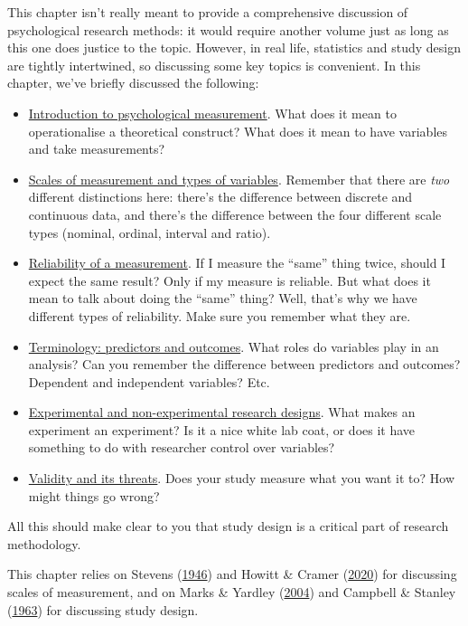 \documentclass[
  11pt,
]{book}
\providecommand{\tightlist}{%
  \setlength{\itemsep}{0pt}\setlength{\parskip}{0pt}}
\theoremstyle{indenteddefinition}
\theoremstyle{indenteddefinition}
\theoremstyle{definition}
\theoremstyle{definition}
\theoremstyle{remark}
\begin{document}
This chapter isn't really meant to provide a comprehensive discussion of psychological research methods: it would require another volume just as long as this one does justice to the topic. However, in real life, statistics and study design are tightly intertwined, so discussing some key topics is convenient. In this chapter, we've briefly discussed the following:

\begin{itemize}
\tightlist
\item
  \protect\hyperlink{measurement}{Introduction to psychological measurement}. What does it mean to operationalise a theoretical construct? What does it mean to have variables and take measurements?
\item
  \protect\hyperlink{scales}{Scales of measurement and types of variables}. Remember that there are \emph{two} different distinctions here: there's the difference between discrete and continuous data, and there's the difference between the four different scale types (nominal, ordinal, interval and ratio).
\item
  \protect\hyperlink{reliability}{Reliability of a measurement}. If I measure the ``same'' thing twice, should I expect the same result? Only if my measure is reliable. But what does it mean to talk about doing the ``same'' thing? Well, that's why we have different types of reliability. Make sure you remember what they are.
\item
  \protect\hyperlink{ivdv}{Terminology: predictors and outcomes}. What roles do variables play in an analysis? Can you remember the difference between predictors and outcomes? Dependent and independent variables? Etc.
\item
  \protect\hyperlink{researchdesigns}{Experimental and non-experimental research designs}. What makes an experiment an experiment? Is it a nice white lab coat, or does it have something to do with researcher control over variables?
\item
  \protect\hyperlink{validity}{Validity and its threats}. Does your study measure what you want it to? How might things go wrong?
\end{itemize}

All this should make clear to you that study design is a critical part of research methodology.

This chapter relies on Stevens (\protect\hyperlink{ref-Stevens1946}{1946}) and Howitt \& Cramer (\protect\hyperlink{ref-howittUnderstandingStatisticsPsychology2020}{2020}) for discussing scales of measurement, and on Marks \& Yardley (\protect\hyperlink{ref-marksResearchMethodsClinical2004}{2004}) and Campbell \& Stanley (\protect\hyperlink{ref-Campbell1963}{1963}) for discussing study design.
\end{document}
